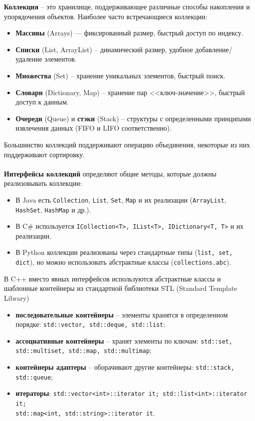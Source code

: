 \documentclass[a4paper, 12pt]{report}
\numberwithin{equation}{section}
\begin{document}
	\textbf{Коллекция} – это хранилище, поддерживающее различные способы накопления и упорядочения объектов. Наиболее часто встречающиеся коллекции: \begin{itemize}
		\item \textbf{Массивы} (Arrays) — фиксированный размер, быстрый доступ по индексу.
		
		\item \textbf{Списки} (List, ArrayList) -- динамический размер, удобное добавление/удаление элементов.
		
		\item \textbf{Множества} (Set) -- хранение уникальных элементов, быстрый поиск.
		
		\item \textbf{Словари} (Dictionary, Map) -- хранение пар <<ключ-значение>>, быстрый доступ к данным.
		
		\item \textbf{Очереди} (Queue) и \textbf{стэки} (Stack) -- структуры с определенными принципами извлечения данных (FIFO и LIFO соответственно).
	\end{itemize} 
	Большинство коллекций поддерживают операцию объединения, некоторые из них поддерживают сортировку.
	\\\\
	\textbf{Интерфейсы коллекций} определяют общие методы, которые должны реализовывать коллекции:
	\begin{itemize}
		\item В Java есть \texttt{Collection}, \texttt{List}, \texttt{Set}, \texttt{Map} и их реализации (\texttt{ArrayList}, \texttt{HashSet}, \texttt{HashMap} и др.).
		\item В C\# используется \texttt{ICollection<T>, IList<T>, IDictionary<T, T>} и их реализации.
		\item В Python коллекции реализованы через стандартные типы (\texttt{list, set, dict}), но можно использовать абстрактные классы (\texttt{collections.abc}).
	\end{itemize}
	В C++ вместо явных интерфейсов используются абстрактные классы и шаблонные контейнеры из стандартной библиотеки STL (Standard Template Library)
	\begin{itemize}
		\item \textbf{последовательные контейнеры} – элементы хранятся в определенном порядке: \texttt{std::vector, std::deque, std::list};
		\item\textbf{ ассоциативные контейнеры} – хранят элементы по ключам: \texttt{std::set, std::multiset, std::map, std::multimap};
		\item \textbf{контейнеры адаптеры} – оборачивают другие контейнеры: \texttt{std::stack, std::queue};
		\item \textbf{итераторы}:
		\texttt{std::vector<int>::iterator it; std::list<int>::iterator it; \\ std::map<int, std::string>::iterator it}.
	\end{itemize}
	
\end{document}
